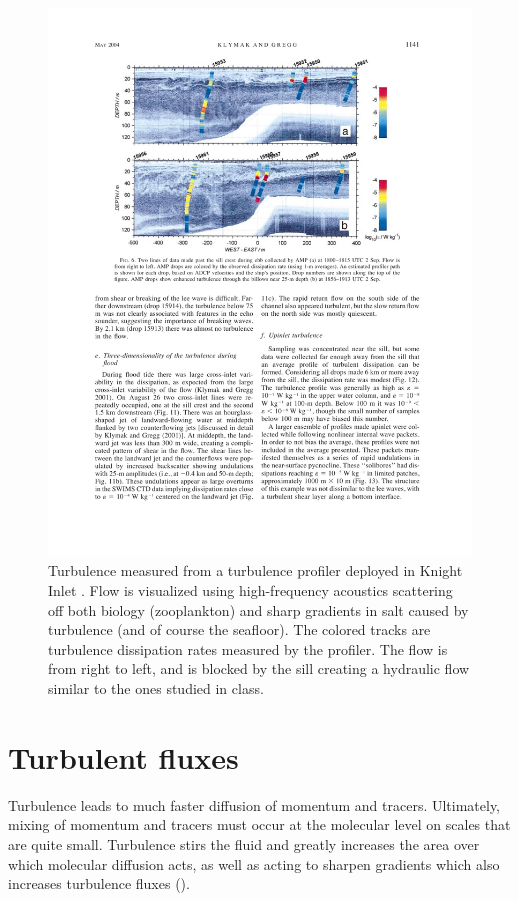 \documentclass[11pt]{article}
\begin{document}
\begin{figure}[hbtp]
  \begin{center}
    \includegraphics[width=5in]{images/KlymakGregg04Fig6}
    \caption{Turbulence measured from a turbulence profiler deployed in Knight Inlet \citep{klymakgregg04}.  Flow is visualized using high-frequency acoustics scattering off both biology (zooplankton) and sharp gradients in salt caused by turbulence (and of course the seafloor).  The colored tracks are turbulence dissipation rates measured by the profiler.  The flow is from right to left, and is blocked  by the sill creating a hydraulic flow similar to the ones studied in class.}   
    \label{fig:KlymakGregg04Fig6}
  \end{center}
\end{figure}

\clearpage
\section{Turbulent fluxes}

Turbulence leads to much faster diffusion of momentum and tracers.  Ultimately, mixing of momentum and tracers must occur at the molecular level on scales that are quite small.   Turbulence stirs the fluid and greatly increases the area over  which molecular diffusion acts, as well as acting to sharpen gradients which also increases turbulence fluxes ().  
\end{document}
